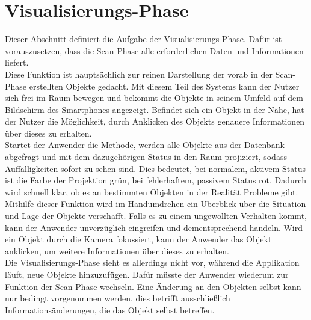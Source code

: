 \section{Visualisierungs-Phase}
\label{chap:Visualisierungs-Phase}
Dieser Abschnitt definiert die Aufgabe der Visualisierungs-Phase. 
Dafür ist vorauszusetzen, dass die Scan-Phase alle erforderlichen Daten und Informationen liefert. 
\\ 
\linebreak
Diese Funktion ist hauptsächlich zur reinen Darstellung der vorab in der Scan-Phase erstellten Objekte gedacht. Mit diesem Teil des Systems 
kann der Nutzer sich frei im Raum bewegen und bekommt die Objekte in seinem Umfeld auf dem Bildschirm des Smartphones angezeigt. 
Befindet sich ein Objekt in der Nähe, hat der Nutzer die Möglichkeit, durch Anklicken des Objekts genauere Informationen über dieses zu erhalten. 
\\ 
\linebreak 
Startet der Anwender die Methode, werden alle Objekte aus der Datenbank abgefragt und mit dem dazugehörigen Status in den Raum 
projiziert, sodass Auffälligkeiten sofort zu sehen sind. Dies bedeutet, bei normalem, aktivem Status ist die Farbe der Projektion grün, 
bei fehlerhaftem, passivem Status rot. Dadurch wird schnell klar, ob es an bestimmten Objekten in der Realität Probleme gibt. Mithilfe dieser 
Funktion wird im Handumdrehen ein Überblick über die Situation und Lage der Objekte verschafft. Falls es zu einem ungewollten Verhalten kommt, 
kann der Anwender unverzüglich eingreifen und dementsprechend handeln. Wird ein Objekt durch die Kamera 
fokussiert, kann der Anwender das Objekt anklicken, um weitere Informationen über dieses zu erhalten. 
\\ 
Die Visualisierungs-Phase sieht es allerdings nicht vor, während die Applikation läuft, neue Objekte hinzuzufügen. Dafür müsste der Anwender wiederum zur 
Funktion der Scan-Phase wechseln. Eine Änderung an den Objekten selbst kann nur bedingt vorgenommen werden, dies betrifft ausschließlich
Informationsänderungen, die das Objekt selbst betreffen.  

